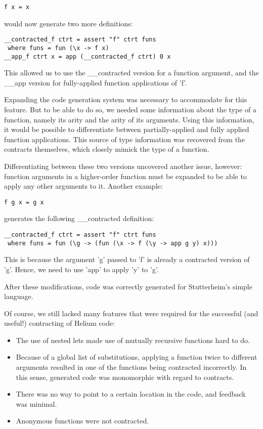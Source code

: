 \documentclass[10pt,a4paper]{article}
\begin{document}
\begin{lstlisting}
f x = x
\end{lstlisting}

would now generate two more definitions:

\begin{lstlisting}
__contracted_f ctrt = assert "f" ctrt funs
 where funs = fun (\x -> f x)
__app_f ctrt x = app (__contracted_f ctrt) 0 x
\end{lstlisting}

This allowed us to use the \_\_contracted version for a function argument,
and the \_\_app version for fully-applied function applications of 'f'.

Expanding the code generation system was necessary to accommodate for this feature.
But to be able to do so, we needed some information about the type of a function, namely its arity and the arity of its arguments.
Using this information, it would be possible to differentiate between partially-applied and fully applied function applications.
This source of type information was recovered from the contracts themselves, which closely mimick the type of a function.

Differentiating between these two versions uncovered another issue, however:
function arguments in a higher-order function must be expanded to be able to apply any other arguments to it.
Another example:

\begin{lstlisting}
f g x = g x
\end{lstlisting}

generates the following \_\_contracted definition:

\begin{lstlisting}
__contracted_f ctrt = assert "f" ctrt funs
 where funs = fun (\g -> (fun (\x -> f (\y -> app g y) x)))
\end{lstlisting}

This is because the argument 'g' passed to 'f' is already a contracted version of 'g'.
Hence, we need to use 'app' to apply 'y' to 'g'.

After these modifications, code was correctly generated for Stutterheim's simple language.

Of course, we still lacked many features that were required for the successful (and useful!) contracting of Helium code:

\begin{itemize}
\item The use of nested lets made use of mutually recursive functions hard to do.
\item Because of a global list of substitutions, applying a function twice to different arguments resulted in one of the functions being contracted incorrectly. In this sense, generated code was monomorphic with regard to contracts.
\item There was no way to point to a certain location in the code, and feedback was minimal.
\item Anonymous functions were not contracted.
\end{itemize}
\end{document}
